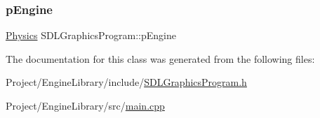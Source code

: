 \subsubsection{\texorpdfstring{pEngine}{pEngine}}
{\footnotesize\ttfamily \mbox{\hyperlink{class_physics}{Physics}} S\+D\+L\+Graphics\+Program\+::p\+Engine}



The documentation for this class was generated from the following files\+:\begin{DoxyCompactItemize}
\item 
Project/\+Engine\+Library/include/\mbox{\hyperlink{_s_d_l_graphics_program_8h}{S\+D\+L\+Graphics\+Program.\+h}}\item 
Project/\+Engine\+Library/src/\mbox{\hyperlink{main_8cpp}{main.\+cpp}}\end{DoxyCompactItemize}
